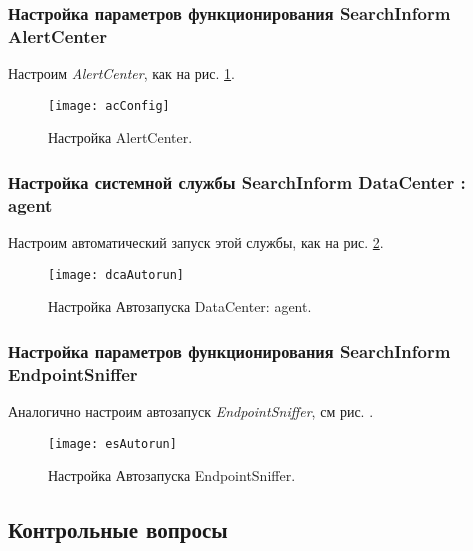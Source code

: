 \subsubsection{Настройка параметров функционирования SearchInform AlertCenter}

Настроим \textit{AlertCenter}, как на рис. \ref{fig:acConfig}.

\begin{figure}[H]
  \centering
  \texttt{[image: acConfig]}
  \caption{Настройка AlertCenter.}\label{fig:acConfig}
\end{figure}

\subsubsection{Настройка системной службы SearchInform DataCenter : agent}

Настроим автоматический запуск этой службы, как на рис. \ref{fig:dcaAutorun}.

\begin{figure}[H]
  \centering
  \texttt{[image: dcaAutorun]}
  \caption{Настройка Автозапуска DataCenter: agent.}\label{fig:dcaAutorun}
\end{figure}

\subsubsection{Настройка параметров функционирования SearchInform
EndpointSniffer}

Аналогично настроим автозапуск \textit{EndpointSniffer}, см рис.
.

\begin{figure}[H]
  \centering
  \texttt{[image: esAutorun]}
  \caption{Настройка Автозапуска EndpointSniffer.}\label{fig:esAutorun}
\end{figure}

\subsection{Контрольные вопросы}


